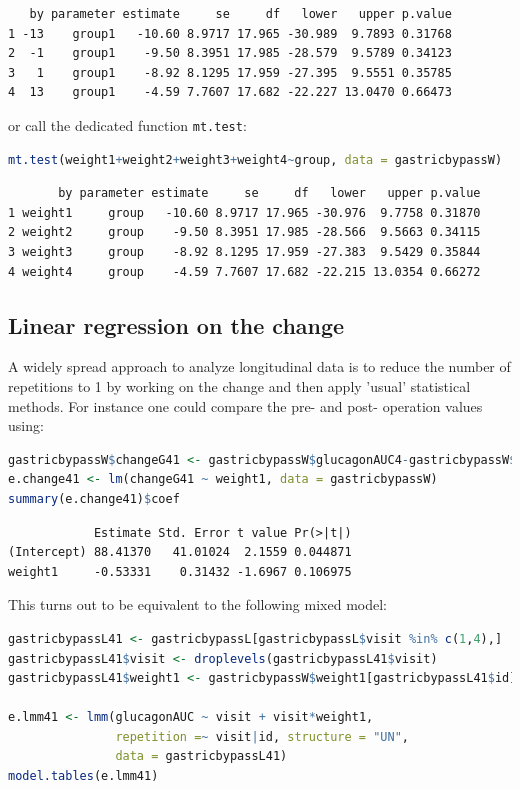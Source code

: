 \documentclass[12pt]{article}
\begin{document}
\label{}
\begin{verbatim}
   by parameter estimate     se     df   lower   upper p.value
1 -13    group1   -10.60 8.9717 17.965 -30.989  9.7893 0.31768
2  -1    group1    -9.50 8.3951 17.985 -28.579  9.5789 0.34123
3   1    group1    -8.92 8.1295 17.959 -27.395  9.5551 0.35785
4  13    group1    -4.59 7.7607 17.682 -22.227 13.0470 0.66473
\end{verbatim}


or call the dedicated function \texttt{mt.test}:
\begin{lstlisting}[language=r,numbers=none]
mt.test(weight1+weight2+weight3+weight4~group, data = gastricbypassW)
\end{lstlisting}

\label{}
\begin{verbatim}
       by parameter estimate     se     df   lower   upper p.value
1 weight1     group   -10.60 8.9717 17.965 -30.976  9.7758 0.31870
2 weight2     group    -9.50 8.3951 17.985 -28.566  9.5663 0.34115
3 weight3     group    -8.92 8.1295 17.959 -27.383  9.5429 0.35844
4 weight4     group    -4.59 7.7607 17.682 -22.215 13.0354 0.66272
\end{verbatim}


\clearpage
\subsection{Linear regression on the change}
\label{sec:orgf294270}

A widely spread approach to analyze longitudinal data is to reduce the
number of repetitions to 1 by working on the change and then apply
'usual' statistical methods. For instance one could compare the pre-
and post- operation values using:

\begin{lstlisting}[language=r,numbers=none]
gastricbypassW$changeG41 <- gastricbypassW$glucagonAUC4-gastricbypassW$glucagonAUC1
e.change41 <- lm(changeG41 ~ weight1, data = gastricbypassW)
summary(e.change41)$coef
\end{lstlisting}

\label{}
\begin{verbatim}
            Estimate Std. Error t value Pr(>|t|)
(Intercept) 88.41370   41.01024  2.1559 0.044871
weight1     -0.53331    0.31432 -1.6967 0.106975
\end{verbatim}


This turns out to be equivalent to the following mixed model:
\begin{lstlisting}[language=r,numbers=none]
gastricbypassL41 <- gastricbypassL[gastricbypassL$visit %in% c(1,4),]
gastricbypassL41$visit <- droplevels(gastricbypassL41$visit)
gastricbypassL41$weight1 <- gastricbypassW$weight1[gastricbypassL41$id]

e.lmm41 <- lmm(glucagonAUC ~ visit + visit*weight1,
               repetition =~ visit|id, structure = "UN",
               data = gastricbypassL41)
model.tables(e.lmm41)
\end{lstlisting}
\end{document}
